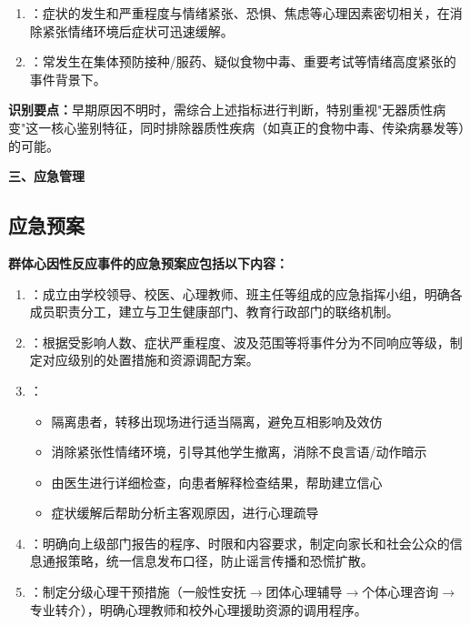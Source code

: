 \begin{keybox}
\begin{keybox}
\begin{enumerate}[leftmargin=*]
    \item {}：症状的发生和严重程度与情绪紧张、恐惧、焦虑等心理因素密切相关，在消除紧张情绪环境后症状可迅速缓解。

    \item {}：常发生在集体预防接种/服药、疑似食物中毒、重要考试等情绪高度紧张的事件背景下。
\end{enumerate}

\textbf{识别要点：}早期原因不明时，需综合上述指标进行判断，特别重视"无器质性病变"这一核心鉴别特征，同时排除器质性疾病（如真正的食物中毒、传染病暴发等）的可能。
\end{keybox}

\textbf{三、应急管理}

\subsection{应急预案}

\begin{keybox}
\textbf{群体心因性反应事件的应急预案应包括以下内容：}

\begin{enumerate}[leftmargin=*]
    \item {}：成立由学校领导、校医、心理教师、班主任等组成的应急指挥小组，明确各成员职责分工，建立与卫生健康部门、教育行政部门的联络机制。

    \item {}：根据受影响人数、症状严重程度、波及范围等将事件分为不同响应等级，制定对应级别的处置措施和资源调配方案。

    \item {}：
    \begin{itemize}
        \item 隔离患者，转移出现场进行适当隔离，避免互相影响及效仿
        \item 消除紧张性情绪环境，引导其他学生撤离，消除不良言语/动作暗示
        \item 由医生进行详细检查，向患者解释检查结果，帮助建立信心
        \item 症状缓解后帮助分析主客观原因，进行心理疏导
    \end{itemize}

    \item {}：明确向上级部门报告的程序、时限和内容要求，制定向家长和社会公众的信息通报策略，统一信息发布口径，防止谣言传播和恐慌扩散。

    \item {}：制定分级心理干预措施（一般性安抚$\rightarrow$团体心理辅导$\rightarrow$个体心理咨询$\rightarrow$专业转介），明确心理教师和校外心理援助资源的调用程序。


\end{enumerate}
\end{keybox}
\end{keybox}
